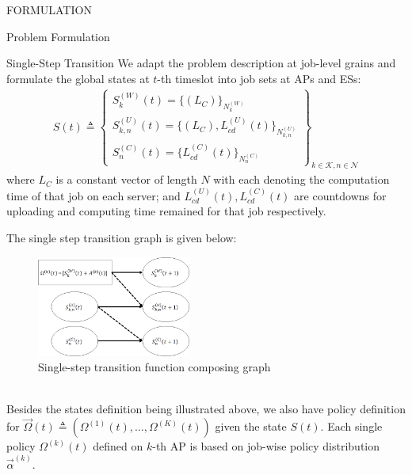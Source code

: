 \documentclass[10pt, conference, letterpaper]{IEEEtran}
\begin{document}
\begin{section}{FORMULATION}
\begin{subsection}{Problem Formulation}
            \begin{subsubsection}{Single-Step Transition}
                We adapt the problem description at job-level grains and formulate the global states at $t$-th timeslot into job sets at APs and ESs:
                \begin{align}
                    S(t) \triangleq
                    \begin{Bmatrix}
                        S_{k}^{(W)}(t) = \{ (L_C) \}_{N_{k}^{(W)}}
                        \\
                        S_{k,n}^{(U)}(t)= \{ (L_C), L_{cd}^{(U)}(t) \}_{N_{k,n}^{(U)}}
                        \\
                        S_{n}^{(C)}(t)  = \{ L_{cd}^{(C)}(t) \}_{N_{n}^{(C)}}
                    \end{Bmatrix}
                    _{k\in\mathcal{K}, n\in\mathcal{N}}
                \end{align}
                where $L_C$ is a constant vector of length $N$ with each denoting the computation time of that job on each server; and $L^{(U)}_{cd}(t), L^{(C)}_{cd}(t)$ are countdowns for uploading and computing time remained for that job respectively.
            
                The single step transition graph is given below:
                \begin{figure}[h]
                    \centering
                    \includegraphics[width=0.45\textwidth]{single-transition.png}
                    \caption{Single-step transition function composing graph}
                    \label{fig:trans}
                \end{figure}
                \\
                Besides the states definition being illustrated above, we also have policy definition for $\vec{\Omega}(t) \triangleq (\Omega^{(1)}(t), \dots, \Omega^{(K)}(t))$ given the state $S(t)$. Each single policy $\Omega^{(k)}(t)$ defined on $k$-th AP is based on job-wise policy distribution $\vec{\alpha}^{(k)}$.


\end{subsubsection}
\end{subsection}
\end{section}
\end{document}
